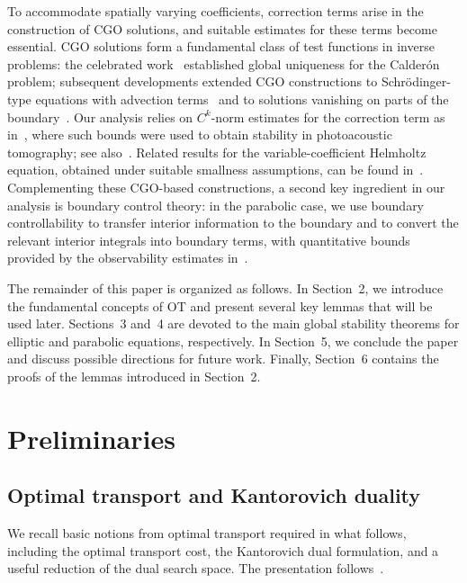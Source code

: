 \documentclass[12pt]{amsart}
\begin{document}
To accommodate spatially varying coefficients, correction terms arise in the construction of CGO solutions, and suitable estimates for these terms become essential. CGO solutions form a fundamental class of test functions in inverse problems: the celebrated work~\cite{sylvester_global_1987} established global uniqueness for the Calder\'on problem; subsequent developments extended CGO constructions to Schr\"odinger-type equations with advection terms~\cite{nakamura_global_1995,salo2004inverse} and to solutions vanishing on parts of the boundary~\cite{kenig_calderon_2007,kenig_calderon_2013}. Our analysis relies on $C^k$-norm estimates for the correction term as in~\cite{bal_inverse_2010}, where such bounds were used to obtain stability in photoacoustic tomography; see also~\cite{qiu_lipschitz_2023,carstea_calderon_2021,feizmohammadi_inverse_2020}. 
Related results for the variable-coefficient Helmholtz equation, obtained under suitable smallness assumptions, can be found in~\cite{bao_recovering_2021}. 
Complementing these CGO-based constructions, a second key ingredient in our analysis is boundary control theory: in the parabolic case, we use boundary controllability to transfer interior information to the boundary and to convert the relevant interior integrals into boundary terms, with quantitative bounds provided by the observability estimates in~\cite{fursikov_controllability_1996}.


The remainder of this paper is organized as follows. In Section~2, we introduce the fundamental concepts of OT and present several key lemmas that will be used later. Sections~3 and~4 are devoted to the main global stability theorems for elliptic and parabolic equations, respectively. In Section~5, we conclude the paper and discuss possible directions for future work. Finally, Section~6 contains the proofs of the lemmas introduced in Section~2.


\section{Preliminaries}
\subsection{Optimal transport and Kantorovich duality}\label{sub: OT}

We recall basic notions from optimal transport required in what follows, including the optimal transport cost, the Kantorovich dual formulation, and a useful reduction of the dual search space. The presentation follows~\cite{villani2003topics}. 
 
\end{document}

